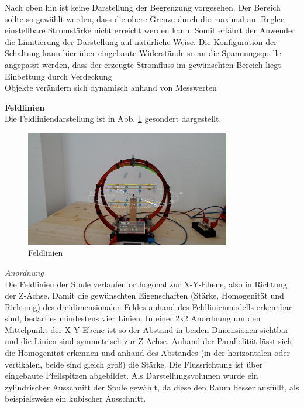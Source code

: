Nach oben hin ist keine Darstellung der Begrenzung vorgesehen. Der Bereich sollte so gewählt werden, dass die obere Grenze durch die maximal am Regler einstellbare Stromstärke nicht erreicht werden kann. Somit erfährt der Anwender die Limitierung der Darstellung auf natürliche Weise. Die Konfiguration der Schaltung kann hier über eingebaute Widerstände so an die Spannungsquelle angepasst werden, dass der erzeugte Stromfluss im gewünschten Bereich liegt.\\

Einbettung durch Verdeckung\\
Objekte verändern sich dynamisch anhand von Messwerten

\textbf{Feldlinien}\\
Die Feldliniendarstellung ist in Abb. \ref{img:mfield-lines} gesondert dargestellt.
\begin{figure}[H]
	\centering
	\includegraphics[width=0.8\textwidth]{images/HL/fieldlines.jpg}
	\caption{Feldlinien}
	\label{img:mfield-lines}
\end{figure}

\textit{Anordnung}\\
Die Feldlinien der Spule verlaufen orthogonal zur X-Y-Ebene, also in Richtung der Z-Achse. Damit die gewünschten Eigenschaften (Stärke, Homogenität und Richtung) des dreidimensionalen Feldes anhand des Feldlinienmodells erkennbar sind, bedarf es mindestens vier Linien. In einer 2x2 Anordnung um den Mittelpunkt der X-Y-Ebene ist so der Abstand in beiden Dimensionen sichtbar und die Linien sind symmetrisch zur Z-Achse. Anhand der Parallelität lässt sich die Homogenität erkennen und anhand des Abstandes (in der horizontalen oder vertikalen, beide sind gleich groß) die Stärke. Die Flussrichtung ist über eingebaute Pfeilspitzen abgebildet. Als Darstellungsvolumen wurde ein zylindrischer Ausschnitt der Spule gewählt, da diese den Raum besser ausfüllt, als beispielsweise ein kubischer Ausschnitt.\\

